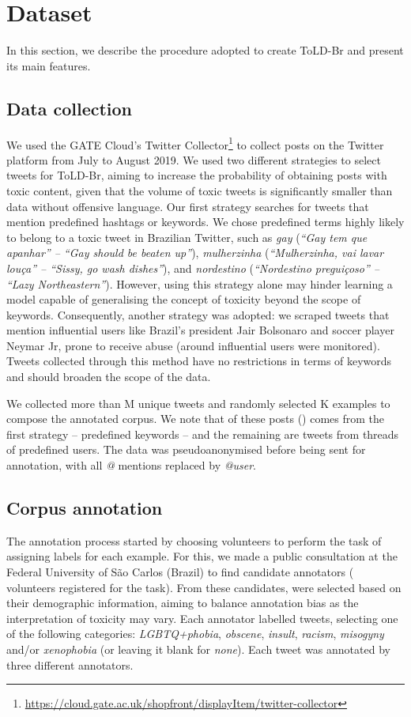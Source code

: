 \documentclass[11pt,a4paper]{article}
\begin{document}
\section{Dataset} \label{sec:dataset}
In this section, we describe the procedure adopted to create ToLD-Br and present its main features.

\subsection{Data collection}
We used the GATE Cloud's Twitter Collector\footnote{\url{https://cloud.gate.ac.uk/shopfront/displayItem/twitter-collector}} to collect posts on the Twitter platform from July to August 2019. We used two different strategies to select tweets for ToLD-Br, aiming to increase the probability of obtaining posts with toxic content, given that the volume of toxic tweets is significantly smaller than data without offensive language.
Our first strategy searches for tweets that mention predefined hashtags or keywords. We chose predefined terms highly likely to belong to a toxic tweet in Brazilian Twitter, such as \textit{gay} (\textit{``Gay tem que apanhar'' -- ``Gay should be beaten up''}), \textit{mulherzinha} (\textit{``Mulherzinha, vai lavar louça'' -- ``Sissy, go wash dishes''}), and \textit{nordestino} (\textit{``Nordestino preguiçoso'' -- ``Lazy Northeastern''}). However, using this strategy alone may hinder learning a model capable of generalising the concept of toxicity beyond the scope of keywords. 
Consequently, another strategy was adopted: we scraped tweets that mention influential users like Brazil's president Jair Bolsonaro and soccer player Neymar Jr, prone to receive abuse (around  influential users were monitored). Tweets collected through this method have no restrictions in terms of keywords and should broaden the scope of the data.

We collected more than M unique tweets and randomly selected K examples to compose the annotated corpus. We note that  of these posts () comes from the first strategy -- predefined keywords -- and the remaining are tweets from threads of predefined users. The data was pseudoanonymised before being sent for annotation, with all \textit{@} mentions replaced by \textit{@user}.


\subsection{Corpus annotation}
The annotation process started by choosing volunteers to perform the task of assigning labels for each example. For this, we made a public consultation at the Federal University of S\~{a}o Carlos (Brazil) to find candidate annotators ( volunteers registered for the task). From these candidates,  were selected based on their demographic information, aiming to balance annotation bias as the interpretation of toxicity may vary. Each annotator labelled  tweets, selecting one of the following categories: \textit{LGBTQ+phobia}, \textit{obscene}, \textit{insult}, \textit{racism}, \textit{misogyny} and/or \textit{xenophobia} (or leaving it blank for \textit{none}). Each tweet was annotated by three different annotators. 
\end{document}
